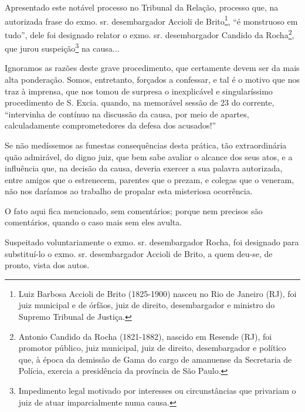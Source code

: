 Apresentado este notável processo no Tribunal da Relação, processo que,
na autorizada frase do exmo. sr. desembargador Accioli de
Brito\footnote{Luiz Barbosa Accioli de Brito (1825-1900) nasceu no Rio
  de Janeiro (RJ), foi juiz municipal e de órfãos, juiz de direito,
  desembargador e ministro do Supremo Tribunal de Justiça.}, ``é
monstruoso em tudo'', dele foi designado relator o exmo. sr.
desembargador Candido da Rocha\footnote{Antonio Candido da Rocha
  (1821-1882), nascido em Resende (RJ), foi promotor público, juiz
  municipal, juiz de direito, desembargador e político que, à época da
  demissão de Gama do cargo de amanuense da Secretaria de Polícia,
  exercia a presidência da província de São Paulo.}, que jurou
suspeição\footnote{Impedimento legal motivado por interesses ou
  circunstâncias que privariam o juiz de atuar imparcialmente numa
  causa.} na causa...

Ignoramos as razões deste grave procedimento, que certamente devem ser
da mais alta ponderação. Somos, entretanto, forçados a confessar, e tal
é o motivo que nos traz à imprensa, que nos tomou de surpresa o
inexplicável e singularíssimo procedimento de S. Excia. quando, na
memorável sessão de 23 do corrente, ``intervinha de contínuo na
discussão da causa, por meio de apartes, calculadamente comprometedores
da defesa dos acusados!''

Se não medíssemos as funestas consequências desta prática, tão
extraordinária quão admirável, do digno juiz, que bem sabe avaliar o
alcance dos seus atos, e a influência que, na decisão da causa, deveria
exercer a sua palavra autorizada, entre amigos que o estrenecem,
parentes que o prezam, e colegas que o veneram, não nos daríamos ao
trabalho de propalar esta misteriosa ocorrência.

O fato aqui fica mencionado, sem comentários; porque nem precisos são
comentários, quando o caso mais sem eles avulta.

Suspeitado voluntariamente o exmo. sr. desembargador Rocha, foi
designado para substituí-lo o exmo. sr. desembargador Accioli de Brito,
a quem deu-se, de pronto, vista dos autos.

